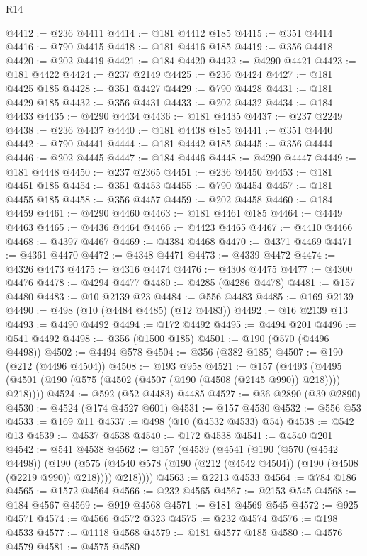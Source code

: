 \begin{lexlean}{R14}
\begin{coremodule}
@4412 := @236 @4411
@4414 := @181 @4412 @185
@4415 := @351 @4414
@4416 := @790 @4415
@4418 := @181 @4416 @185
@4419 := @356 @4418
@4420 := @202 @4419
@4421 := @184 @4420
@4422 := @4290 @4421
@4423 := @181 @4422
@4424 := @237 @2149
@4425 := @236 @4424
@4427 := @181 @4425 @185
@4428 := @351 @4427
@4429 := @790 @4428
@4431 := @181 @4429 @185
@4432 := @356 @4431
@4433 := @202 @4432
@4434 := @184 @4433
@4435 := @4290 @4434
@4436 := @181 @4435
@4437 := @237 @2249
@4438 := @236 @4437
@4440 := @181 @4438 @185
@4441 := @351 @4440
@4442 := @790 @4441
@4444 := @181 @4442 @185
@4445 := @356 @4444
@4446 := @202 @4445
@4447 := @184 @4446
@4448 := @4290 @4447
@4449 := @181 @4448
@4450 := @237 @2365
@4451 := @236 @4450
@4453 := @181 @4451 @185
@4454 := @351 @4453
@4455 := @790 @4454
@4457 := @181 @4455 @185
@4458 := @356 @4457
@4459 := @202 @4458
@4460 := @184 @4459
@4461 := @4290 @4460
@4463 := @181 @4461 @185
@4464 := @4449 @4463
@4465 := @4436 @4464
@4466 := @4423 @4465
@4467 := @4410 @4466
@4468 := @4397 @4467
@4469 := @4384 @4468
@4470 := @4371 @4469
@4471 := @4361 @4470
@4472 := @4348 @4471
@4473 := @4339 @4472
@4474 := @4326 @4473
@4475 := @4316 @4474
@4476 := @4308 @4475
@4477 := @4300 @4476
@4478 := @4294 @4477
@4480 := @4285 (@4286 @4478)
@4481 := @157 @4480
@4483 := @10 @2139 @23
@4484 := @556 @4483
@4485 := @169 @2139
@4490 := @498 (@10 (@4484 @4485) (@12 @4483))
@4492 := @16 @2139 @13
@4493 := @4490 @4492
@4494 := @172 @4492
@4495 := @4494 @201
@4496 := @541 @4492
@4498 := @356 (@1500 @185)
@4501 := @190 (@570 (@4496 @4498))
@4502 := @4494 @578
@4504 := @356 (@382 @185)
@4507 := @190 (@212 (@4496 @4504))
@4508 := @193 @958
@4521 := @157
    (@4493 (@4495 (@4501 (@190 (@575 (@4502 (@4507 (@190 (@4508 (@2145 @990)) @218)))) @218))))
@4524 := @592 (@52 @4483) @4485
@4527 := @36 @2890 (@39 @2890)
@4530 := @4524 (@174 @4527 @601)
@4531 := @157 @4530
@4532 := @556 @53
@4533 := @169 @11
@4537 := @498 (@10 (@4532 @4533) @54)
@4538 := @542 @13
@4539 := @4537 @4538
@4540 := @172 @4538
@4541 := @4540 @201
@4542 := @541 @4538
@4562 := @157
    (@4539
      (@4541
        (@190
          (@570 (@4542 @4498))
          (@190
            (@575 (@4540 @578 (@190 (@212 (@4542 @4504)) (@190 (@4508 (@2219 @990)) @218))))
            @218))))
@4563 := @2213 @4533
@4564 := @784 @186
@4565 := @1572 @4564
@4566 := @232 @4565
@4567 := @2153 @545
@4568 := @184 @4567
@4569 := @919 @4568
@4571 := @181 @4569 @545
@4572 := @925 @4571
@4574 := @4566 @4572 @323
@4575 := @232 @4574
@4576 := @198 @4533
@4577 := @1118 @4568
@4579 := @181 @4577 @185
@4580 := @4576 @4579
@4581 := @4575 @4580

\end{coremodule}
\end{lexlean}
